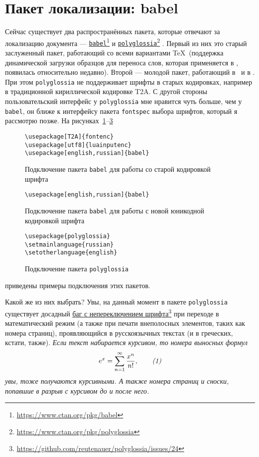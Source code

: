 \documentclass[a4paper,12pt]{article}
\let\orighref=\href
\renewcommand\href[2]{%
  \orighref{#1}{#2}\footnote{\url{#1}}%
}
\begin{document}
\section{Пакет локализации: babel}
Сейчас существует два распространённых пакета, которые отвечают за
локализацию документа --- \href{https://www.ctan.org/pkg/babel}{\texttt{babel}} и
\href{https://www.ctan.org/pkg/polyglossia}{\texttt{polyglossia}}.
Первый из них это старый заслуженный пакет, работающий со всеми
вариантами \TeX\ (поддержка динамической загрузки образцов для
переноса слов, которая применяется в \LuaTeX, появилась относительно
недавно). Второй --- молодой пакет, работающий в \XeLaTeX\ и в \LuaLaTeX.
При этом \texttt{polyglossia} не поддерживает шрифты в старых кодировках,
например в традиционной кириллической кодировке T2A. С другой стороны
пользовательский интерфейс у \texttt{polyglossia} мне нравится чуть больше,
чем у \texttt{babel}, он ближе к интерфейсу пакета \texttt{fontspec}
выбора шрифтов, который я рассмотрю позже. На рисунках~\ref{babel1}--\ref{polygl1}
\begin{figure}[tp]
\footnotesize
\begin{verbatim}
\usepackage[T2A]{fontenc}
\usepackage[utf8]{luainputenc}
\usepackage[english,russian]{babel}
\end{verbatim}
\caption{Подключение пакета \texttt{babel} для работы со старой кодировкой шрифта}\label{babel1}
\end{figure}
\begin{figure}[tp]
\footnotesize
\begin{verbatim}
\usepackage[english,russian]{babel}
\end{verbatim}
\caption{Подключение пакета \texttt{babel} для работы с новой юникодной кодировкой шрифта}\label{babel2}
\end{figure}
\begin{figure}[tp]
\footnotesize
\begin{verbatim}
\usepackage{polyglossia}
\setmainlanguage{russian}
\setotherlanguage{english}
\end{verbatim}
\caption{Подключение пакета \texttt{polyglossia}}\label{polygl1}
\end{figure}
приведены примеры подключения этих пакетов.

Какой же из них выбрать? Увы, на данный момент в пакете \texttt{polyglossia}
существует досадный \href{https://github.com/reutenauer/polyglossia/issues/24}{баг
с непереключением шрифта} при переходе в математический
режим (а также при печати внеполосных элементов, таких как номера страниц),
проявляющийся в русскоязычных текстах (и в греческих, кстати, также).
{\itshape Если текст набирается курсивом, то номера выносных формул
\begin{equation}
e^x=\sum_{n=1}^\infty\frac{x^n}{n!},\tag*{\textit{(1)}}
\end{equation}
увы, тоже получаются курсивными. А также номера страниц и сноски, попавшие
в разрыв с курсивом до и после него.}
\end{document}
